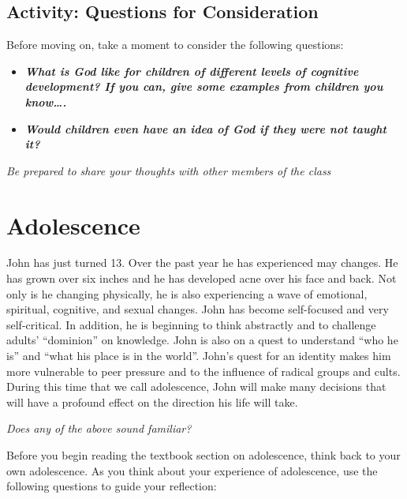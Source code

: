 \documentclass[
]{book}
\providecommand{\tightlist}{%
  \setlength{\itemsep}{0pt}\setlength{\parskip}{0pt}}
\begin{document}
\hypertarget{activity-questions-for-consideration-3}{%
\subsection*{Activity: Questions for Consideration}\label{activity-questions-for-consideration-3}}

\begin{reflect}
Before moving on, take a moment to consider the following questions:

\begin{itemize}
\tightlist
\item
  \textbf{\emph{What is God like for children of different levels of cognitive development? If you can, give some examples from children you know\ldots.}}\\
\item
  \textbf{\emph{Would children even have an idea of God if they were not taught it?}}
\end{itemize}

\emph{Be prepared to share your thoughts with other members of the class}
\end{reflect}

\hypertarget{adolescence}{%
\section{Adolescence}\label{adolescence}}

John has just turned 13. Over the past year he has experienced may changes. He has grown over six inches and he has developed acne over his face and back. Not only is he changing physically, he is also experiencing a wave of emotional, spiritual, cognitive, and sexual changes. John has become self-focused and very self-critical. In addition, he is beginning to think abstractly and to challenge adults' ``dominion'' on knowledge. John is also on a quest to understand ``who he is'' and ``what his place is in the world''. John's quest for an identity makes him more vulnerable to peer pressure and to the influence of radical groups and cults. During this time that we call adolescence, John will make many decisions that will have a profound effect on the direction his life will take.

\emph{Does any of the above sound familiar?}

Before you begin reading the textbook section on adolescence, think back to your own adolescence. As you think about your experience of adolescence, use the following questions to guide your reflection:
\end{document}
